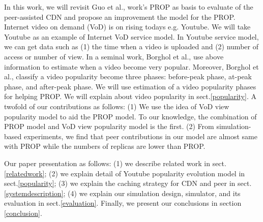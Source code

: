 \documentclass[10pt,final,journal,a4paper]{IEEEtran}
\begin{document}
In this work, we will revisit Guo et al., \cite{1613869} work's PROP as basis to evaluate of the peer-assisted CDN and propose an improvement the model for the PROP.
Internet video on demand (VoD) is on rising todays e.g. Youtube.
We will take Youtube as an example of Internet VoD service model.
In Youtube service model, we can get data such as (1) the time when a video is uploaded and (2) number of access or number of view.
In a seminal work, Borghol et al., \cite{Borghol:2011:CMP:2039452.2039717} use above information to estimate when a video become very popular.
Moreover, Borghol et al., \cite{Borghol:2011:CMP:2039452.2039717} classify a video popularity become three phases: before-peak phase, at-peak phase, and after-peak phase.
We will use estimation of a video popularity phases for helping PROP.
We will explain about video popularity in sect.\ref{popularity}.
A twofold of our contributions as follows:
(1) We use the idea of VoD view popularity model to aid the PROP model. 
To our knowledge, the combination of PROP model and VoD view popularity model is the first.
(2) From simulation-based experiments, we find that peer contributions in our model are almost same with PROP while the numbers of replicas are lower than PROP.

Our paper presentation as follows: (1) we describe related work in sect.\ref{relatedwork}; (2) we explain detail of Youtube popularity evolution model in sect.\ref{popularity}; (3) we explain the caching strategy for CDN and peer in sect.\ref{systemdescription}; (4) we explain our simulation design, simulator, and its evaluation in sect.\ref{evaluation}.
Finally, we present our conclusions in section \ref{conclusion}.
\end{document}
